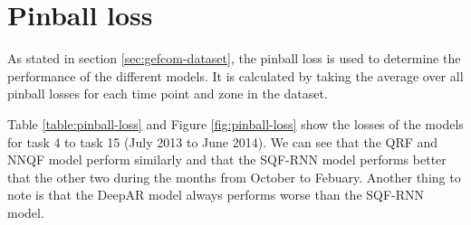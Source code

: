 \section{Pinball loss}
\label{sec:elaboration-pinball-loss}

As stated in section \ref{sec:gefcom-dataset}, the pinball loss is 
used to determine the performance of the different models. 
It is calculated by taking the average over all pinball losses for each time 
point and zone in the dataset. 

Table \ref{table:pinball-loss} and Figure \ref{fig:pinball-loss} show the 
losses of the models for task 4 to task 15 (July 2013 to June 2014). 
We can see that the QRF and NNQF model perform similarly and that the 
SQF-RNN model performs better that the other two during the months from October to Febuary.
Another thing to note is that the DeepAR model always performs worse than the SQF-RNN model.

